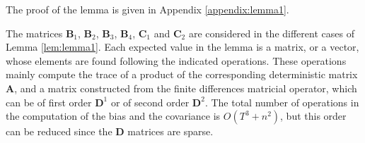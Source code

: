 \normalsize

The proof of the lemma is given in Appendix \ref{appendix:lemma1}.

The matrices $\mathbf{B}_1$, $\mathbf{B}_2$, $\mathbf{B}_3$, $\mathbf{B}_4$, $\mathbf{C}_1$ and $\mathbf{C}_2$ are considered in the different cases of Lemma \ref{lem:lemma1}.
Each expected value in the lemma is a matrix, or a vector, whose elements are found following the indicated operations.
These operations mainly compute the trace of a product of the corresponding deterministic matrix $\mathbf{A}$, and a matrix constructed from the finite differences matricial operator, which can be of first order $\mathbf{D}^{1}$ or of second order $\mathbf{D}^{2}$.
The total number of operations in the computation of the bias and the covariance is $O\left( T^3 + n^2 \right)$, but this order can be reduced since the $\mathbf{D}$ matrices are sparse.

